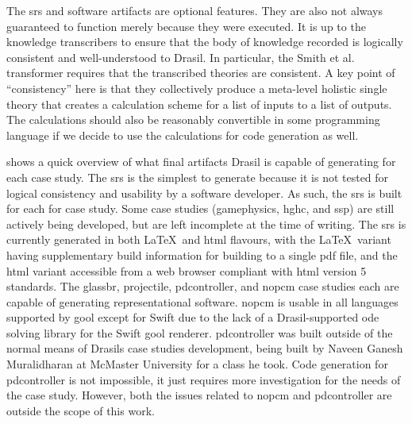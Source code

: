 The \acs{srs} and software artifacts are optional features. They are also not
always guaranteed to function merely because they were executed. It is up to the
knowledge transcribers to ensure that the body of knowledge recorded is
logically consistent and well-understood to Drasil. In particular, the Smith et
al. transformer requires that the transcribed theories are consistent. A key
point of ``consistency'' here is that they collectively produce a meta-level
holistic single theory that creates a calculation scheme for a list of inputs to
a list of outputs. The calculations should also be reasonably convertible in
some programming language if we decide to use the calculations for code
generation as well.

\caseStudiesCodeTable{}

 shows a quick overview of what final artifacts
Drasil is capable of generating for each case study. The \acs{srs} is the
simplest to generate because it is not tested for logical consistency and
usability by a software developer. As such, the \acs{srs} is built for each for
case study. Some case studies (\acs{gamephysics}, \acs{hghc}, and \acs{ssp}) are
still actively being developed, but are left incomplete at the time of writing.
The \acs{srs} is currently generated in both \LaTeX{}\ and \acs{html} flavours,
with the \LaTeX{}\ variant having supplementary build information for building
to a single \acs{pdf} file, and the \acs{html} variant accessible from a web
browser compliant with \acs{html} version 5 standards. The \acs{glassbr},
\acs{projectile}, \acs{pdcontroller}, and \acs{nopcm} case studies each are
capable of generating representational software. \acs{nopcm} is usable in all
languages supported by \acs{gool} except for Swift due to the lack of a
Drasil-supported \acs{ode} solving library for the Swift \acs{gool} renderer.
\acs{pdcontroller} was built outside of the normal means of Drasils case studies
development, being built by Naveen Ganesh Muralidharan \cite{DrasilPR2289Naveen}
at McMaster University for a class he took. Code generation for
\acs{pdcontroller} is not impossible, it just requires more investigation for
the needs of the case study. However, both the issues related to \acs{nopcm} and
\acs{pdcontroller} are outside the scope of this work.

